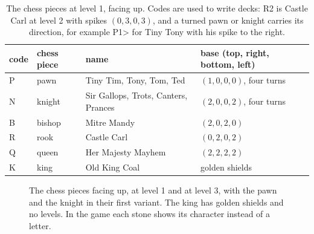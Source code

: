 \documentclass[11pt,a4paper]{article}
\newcommand{\spikes}[2]{%
  \ifnum#1>0
    \pgfmathsetmacro{\sw}{#1<=3 ? 0.18 : (#1==4 ? 0.145 : 0.12)}%
    \pgfmathsetmacro{\hw}{#1<=3 ? 0.075 : \sw/2}%
    \foreach \j in {1,...,#1}{%
      \pgfmathsetmacro{\sx}{(\j-(#1+1)/2)*\sw}%
      \fill[#2] (\sx-\hw,0.5) -- (\sx,0.66) -- (\sx+\hw,0.5) -- cycle;}%
  \fi}
\newcommand{\stone}[9]{\begin{scope}[shift={(#1,#2)}, scale=0.74]
  \filldraw[fill=#8, draw=#7, thick, rounded corners=1.5pt] (-0.5,-0.5) rectangle (0.5,0.5);
  \begin{scope}[rotate=0]\spikes{#3}{#7}\end{scope}
  \begin{scope}[rotate=-90]\spikes{#4}{#7}\end{scope}
  \begin{scope}[rotate=180]\spikes{#5}{#7}\end{scope}
  \begin{scope}[rotate=90]\spikes{#6}{#7}\end{scope}
  \node[font=\scriptsize\bfseries, text=#7] at (0,0) {#9};
\end{scope}}
\begin{document}
\begin{table}[ht]
\centering
\begin{tabular}{llll}
\toprule
code & chess piece & name & base (top, right, bottom, left) \\
\midrule
P & pawn & Tiny Tim, Tony, Tom, Ted & $(1,0,0,0)$, four turns \\
N & knight & Sir Gallops, Trots, Canters, Prances & $(2,0,0,2)$, four turns \\
B & bishop & Mitre Mandy & $(2,0,2,0)$ \\
R & rook & Castle Carl & $(0,2,0,2)$ \\
Q & queen & Her Majesty Mayhem & $(2,2,2,2)$ \\
K & king & Old King Coal & golden shields \\
\bottomrule
\end{tabular}
\caption{The chess pieces at level 1, facing up. Codes are used to write decks: R2 is Castle Carl at level 2 with spikes $(0,3,0,3)$, and a turned pawn or knight carries its direction, for example P1> for Tiny Tony with his spike to the right.}
\label{tab:pieces}
\end{table}

\begin{figure}[ht]
\centering
{}
\caption{The chess pieces facing up, at level 1 and at level 3, with the pawn and the knight in their first variant. The king has golden shields and no levels. In the game each stone shows its character instead of a letter.}
\label{fig:pieces}
\end{figure}
\end{document}
